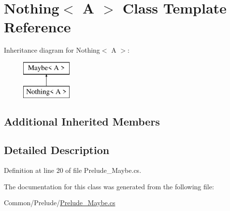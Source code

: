 \hypertarget{class_nothing_3_01_a_01_4}{\section{Nothing$<$ A $>$ Class Template Reference}
\label{class_nothing_3_01_a_01_4}
}
Inheritance diagram for Nothing$<$ A $>$\+:\begin{figure}[H]
\begin{center}
\leavevmode
\includegraphics[height=2.000000cm]{class_nothing_3_01_a_01_4}
\end{center}
\end{figure}
\subsection*{Additional Inherited Members}


\subsection{Detailed Description}


Definition at line 20 of file Prelude\+\_\+\+Maybe.\+cs.



The documentation for this class was generated from the following file\+:\begin{DoxyCompactItemize}
\item 
Common/\+Prelude/\hyperlink{_prelude___maybe_8cs}{Prelude\+\_\+\+Maybe.\+cs}\end{DoxyCompactItemize}
